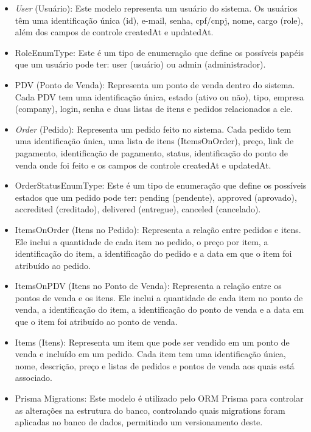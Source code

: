 \begin{itemize}
    \item \textit{User} (Usuário): Este modelo representa um usuário do sistema. Os usuários têm uma identificação única (id), e-mail, senha, cpf/cnpj, nome, cargo (role), além dos campos de controle createdAt e updatedAt.
    \item RoleEnumType: Este é um tipo de enumeração que define os possíveis papéis que um usuário pode ter: user (usuário) ou admin (administrador).
    \item PDV (Ponto de Venda): Representa um ponto de venda dentro do sistema. Cada PDV tem uma identificação única, estado (ativo ou não), tipo, empresa (company), login, senha e duas listas de itens e pedidos relacionados a ele.
    \item \textit{Order} (Pedido): Representa um pedido feito no sistema. Cada pedido tem uma identificação única, uma lista de itens (ItemsOnOrder), preço, link de pagamento, identificação de pagamento, status, identificação do ponto de venda onde foi feito e os campos de controle createdAt e updatedAt.
    \item OrderStatusEnumType: Este é um tipo de enumeração que define os possíveis estados que um pedido pode ter: pending (pendente), approved (aprovado), accredited (creditado), delivered (entregue), canceled (cancelado).
    \item ItemsOnOrder (Itens no Pedido): Representa a relação entre pedidos e itens. Ele inclui a quantidade de cada item no pedido, o preço por item, a identificação do item, a identificação do pedido e a data em que o item foi atribuído ao pedido.
    \item ItemsOnPDV (Itens no Ponto de Venda): Representa a relação entre os pontos de venda e os itens. Ele inclui a quantidade de cada item no ponto de venda, a identificação do item, a identificação do ponto de venda e a data em que o item foi atribuído ao ponto de venda.
    \item Items (Itens): Representa um item que pode ser vendido em um ponto de venda e incluído em um pedido. Cada item tem uma identificação única, nome, descrição, preço e listas de pedidos e pontos de venda aos quais está associado.
    \item Prisma Migrations: Este modelo é utilizado pelo ORM Prisma para controlar as alterações na estrutura do banco, controlando quais migrations foram aplicadas no banco de dados, permitindo um versionamento deste.
\end{itemize}

